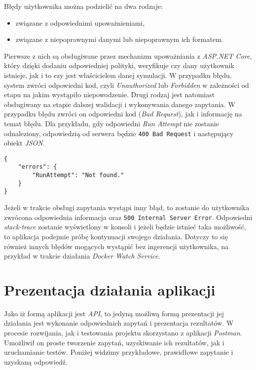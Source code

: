 \par Błędy użytkownika można podzielić na dwa rodzaje:
\begin{itemize}
	\item związane z odpowiednimi upoważnieniami,
	\item związane z niepoprawnymi danymi lub niepoprawnym ich formatem.
\end{itemize}
Pierwsze z nich są obsługiwane przez mechanizm upoważniania z \emph{ASP.NET Core}, który dzięki dodaniu odpowiedniej polityki, weryfikuje czy dany użytkownik istnieje, jak i to czy jest właścicielem danej symulacji. W przypadku błędu, system zwróci odpowiedni kod, czyli \emph{Unauthorized} lub \emph{Forbidden} w zależności od etapu na jakim wystąpiło niepowodzenie. Drugi rodzaj jest natomiast obsługiwany na etapie dalszej walidacji i wykonywania danego zapytania. W przypadku błędu zwróci on odpowiedni kod (\emph{Bad Request}), jak i informację na temat błędu. Dla przykładu, gdy odpowiedni \emph{Run Attempt} nie zostanie odnaleziony, odpowiedzią od serwera będzie \texttt{400 Bad Request} i następujący obiekt \emph{JSON}.

\begin{lstlisting}
{
	"errors": {
		"RunAttempt": "Not found."
	}
}
\end{lstlisting}

\par Jeżeli w trakcie obsługi zapytania wystąpi inny błąd, to zostanie do użytkownika zwrócona odpowiednia informacja oraz \texttt{500 Internal Server Error}. Odpowiedni \emph{stack-trace} zostanie wyświetlony w konsoli i jeżeli będzie istnieć taka możliwość, to aplikacja podejmie próbę kontynuacji swojego działania. Dotyczy to się również innych błędów mogących wystąpić bez ingerencji użytkownika, na przykład w trakcie działania \emph{Docker Watch Service}.

\section{Prezentacja działania aplikacji}

\par Jako iż formą aplikacji jest \emph{API}, to jedyną możliwą formą prezentacji jej działania jest wykonanie odpowiednich zapytań i prezentacja rezultatów. W procesie rozwijania, jak i testowania projektu skorzystano z aplikacji \emph{Postman}. Umożliwił on proste tworzenie zapytań, uzyskiwanie ich rezultatów, jak i uruchamianie testów. Poniżej widzimy przykładowe, prawidłowe zapytanie i uzyskaną odpowiedź.

